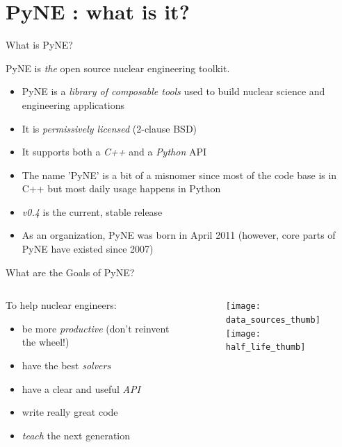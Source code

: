 \documentclass[xcolor=x11names,compress]{beamer}
\renewcommand{\(}{\begin{columns}}
\renewcommand{\)}{\end{columns}}
\newcommand{\<}[1]{\begin{column}{#1}}
\renewcommand{\>}{\end{column}}
\begin{document}
\section{PyNE \cite{pyne}: what is it?}
\begin{frame}{What is PyNE?}

    PyNE is \textit{the} open source nuclear engineering toolkit.
    \vspace*{1em}
    \begin{itemize}
    \item PyNE is a \textit{library of composable tools} used to build 
    nuclear science and engineering applications
    \item It is \textit{permissively licensed} (2-clause BSD)
    \item It supports both a \textit{C++} and a \textit{Python} API
    \item The name 'PyNE' is a bit of a misnomer since most of the code 
    base is in C++ but most daily usage happens in Python
    \item \textit{v0.4} is the current, stable release
    \item As an organization, PyNE was born in April 2011 
    (however, core parts of PyNE have existed since 2007)
    \end{itemize}

\end{frame}

\begin{frame}{What are the Goals of PyNE?}

    \begin{columns}
    \begin{column}{0.4\textwidth}
        To help nuclear engineers:
        \begin{itemize}
        \item be more \textit{productive} (don't reinvent the wheel!)
        \item have the best \textit{solvers}
        \item have a clear and useful \textit{API}
        \item write really great code
        \item \textit{teach} the next generation
        \end{itemize}
  	\end{column}
 	\begin{column}{0.5\textwidth}
 	   \begin{center}
 	   \begin{figure}
 	   \texttt{[image: data\_sources\_thumb]}  \\
       \texttt{[image: half\_life\_thumb]}
	   \end{figure}
 	   \end{center}
  	\end{column}
	\end{columns}

\end{frame}
\end{document}
